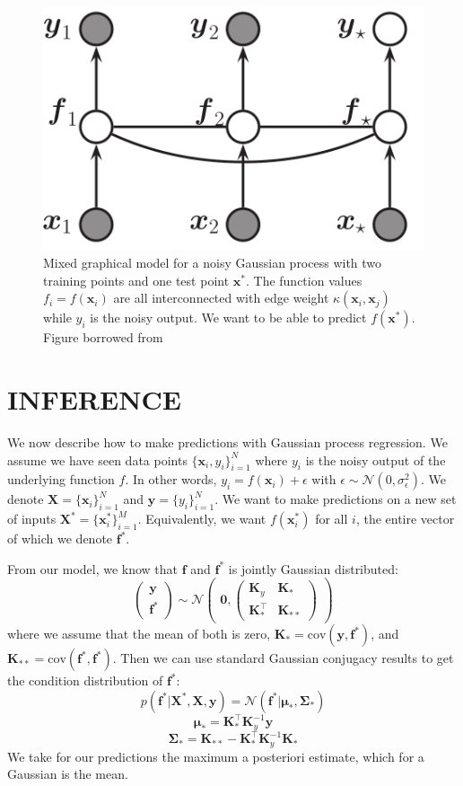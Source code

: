 \documentclass[letterpaper, 12 pt, conference]{ieeeconf}  %
\newcommand{\by}{\textbf{y}}
\newcommand{\bx}{\textbf{x}}
\newcommand{\bX}{\textbf{X}}
\newcommand{\bK}{\textbf{K}}
\newcommand{\cov}{\text{cov}}
\begin{document}
   \begin{figure}[thpb]
      \centering
      \includegraphics[scale=1.0]{graphical_model.PNG}
      \caption{Mixed graphical model for a noisy Gaussian process with two training points and one test point $\bx^*$. The function values $f_i = f(\bx_i)$ are all interconnected with edge weight $\kappa(\bx_i, \bx_j)$ while $y_i$ is the noisy output. We want to be able to predict $f(\bx^*)$. Figure borrowed from \cite{c2}}
      \label{gm}
   \end{figure}

\section{INFERENCE}

We now describe how to make predictions with Gaussian process regression. We assume we have seen data points $\{\bx_i, y_i\}_{i=1}^N$ where $y_i$ is the noisy output of the underlying function $f$. In other words, $y_i = f(\bx_i) + \epsilon$ with $\epsilon \sim \mathcal{N}(0, \sigma_\epsilon^2)$. We denote $\bX = \{\bx_i\}_{i=1}^N$ and $\by = \{y_i\}_{i=1}^N$. We want to make predictions on a new set of inputs $\bX^* = \{\textbf{x}^*_i\}_{i=1}^M$. Equivalently, we want $f(\textbf{x}^*_i)$ for all $i$, the entire vector of which we denote $\textbf{f}^*$.

From our model, we know that $\textbf{f}$ and $\textbf{f}^*$ is jointly Gaussian distributed:
$$\begin{pmatrix}
\by \\ \textbf{f}^*
\end{pmatrix} \sim \mathcal{N}\begin{pmatrix}
\textbf{0}, \begin{pmatrix}
\bK_y & \bK_* \\
\bK_*^\top & \bK_{**}
\end{pmatrix}
\end{pmatrix}
$$
where we assume that the mean of both is zero, $\bK_* = \cov(\by, \textbf{f}^*)$, and $\bK_{**} = \cov(\textbf{f}^*, \textbf{f}^*)$. Then we can use standard Gaussian conjugacy results to get the condition distribution of $\textbf{f}^*$:
$$p(\textbf{f}^*|\bX^*,\bX, \by) = \mathcal{N}(\textbf{f}^*|\bm{\mu}_*, \bm{\Sigma}_*)$$
$$\bm{\mu}_* = \bK_*^\top \bK_y^{-1} \by$$
$$\bm{\Sigma}_* = \bK_{**} - \bK_*^\top \bK_y^{-1} \bK_*$$
We take for our predictions the maximum a posteriori estimate, which for a Gaussian is the mean.
\end{document}
